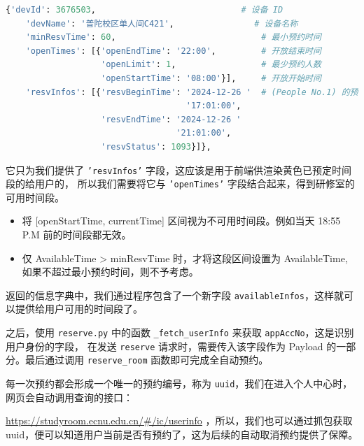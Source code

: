 \begin{lstlisting}[language=python]
    {'devId': 3676503,                             # 设备 ID
    'devName': '普陀校区单人间C421',                # 设备名称
    'minResvTime': 60,                             # 最小预约时间
    'openTimes': [{'openEndTime': '22:00',         # 开放结束时间
                   'openLimit': 1,                 # 最少预约人数
                   'openStartTime': '08:00'}],     # 开放开始时间
    'resvInfos': [{'resvBeginTime': '2024-12-26 '  # (People No.1) 的预约信息
                                    '17:01:00',
                   'resvEndTime': '2024-12-26 '
                                  '21:01:00',
                   'resvStatus': 1093}]},
\end{lstlisting}

它只为我们提供了 \texttt{'resvInfos'} 字段，这应该是用于前端供渲染黄色已预定时间段的给用户的，
所以我们需要将它与 \texttt{'openTimes'} 字段结合起来，得到研修室的可用时间段。

\begin{note}
    \begin{itemize}
        \item 将 [openStartTime, currentTime] 区间视为不可用时间段。例如当天 18:55 P.M 前的时间段都无效。
        \item 仅 AvailableTime > minResvTime 时，才将这段区间设置为 AvailableTime, 如果不超过最小预约时间，则不予考虑。
    \end{itemize}
\end{note}

返回的信息字典中，我们通过程序包含了一个新字段 \texttt{availableInfos}，这样就可以提供给用户可用的时间段了。

之后，使用 \texttt{reserve.py} 中的函数 \texttt{\_fetch\_userInfo} 来获取 \texttt{appAccNo}，这是识别用户身份的字段，
在发送 \texttt{reserve} 请求时，需要传入该字段作为 Payload 的一部分。最后通过调用 \texttt{reserve\_room} 函数即可完成全自动预约。

\begin{note}
    每一次预约都会形成一个唯一的预约编号，称为 \texttt{uuid}，我们在进入个人中心时，网页会自动调用查询的接口：

    \href{https://studyroom.ecnu.edu.cn/#/ic/userinfo}{\underline{https://studyroom.ecnu.edu.cn/\#/ic/userinfo}}
    ，所以，我们也可以通过抓包获取 uuid，便可以知道用户当前是否有预约了，这为后续的自动取消预约提供了保障。
\end{note}
